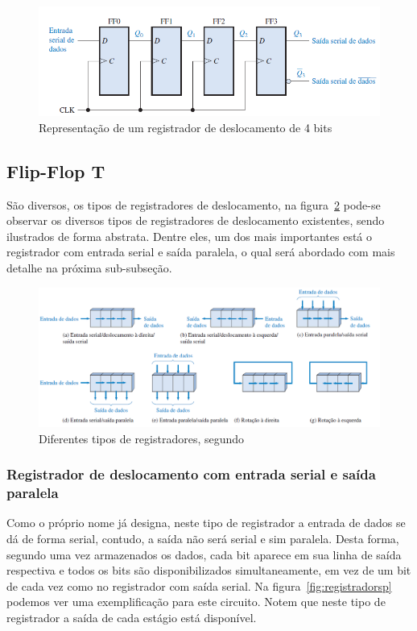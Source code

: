 \documentclass[12pt]{article}
\begin{document}
\begin{figure}[!htbp]
\centering
\includegraphics[width=.7\textwidth]{img/p4/Fig5RegistradorDeslocamento.png}
\caption{Representação de um registrador de deslocamento de 4 bits \cite{floyd2011digital}}
\label{fig:rdeslocamento}
\end{figure}


\subsection{Flip-Flop T}

São diversos, os tipos de registradores de deslocamento, na figura~\ref{fig:registradores} pode-se observar os diversos tipos de registradores de deslocamento existentes, sendo ilustrados de forma abstrata. Dentre eles, um dos mais importantes está o registrador com entrada serial e saída paralela, o qual será abordado com mais detalhe na próxima sub-subseção.

\begin{figure}[!htbp]
\centering
\includegraphics[width=.8\textwidth]{img/p4/Fig6tipodeRegistrador.png}
\caption{Diferentes tipos de registradores, segundo \cite{floyd2011digital}}
\label{fig:registradores}
\end{figure}

\subsubsection{Registrador de deslocamento com entrada serial e saída paralela}

Como o próprio nome já designa, neste tipo de registrador a entrada de dados se dá de forma serial, contudo, a saída não será serial e sim paralela. Desta forma, segundo \cite{floyd2011digital} uma vez armazenados os dados, cada bit aparece em sua linha de saída respectiva e todos os bits são disponibilizados simultaneamente, em vez de um bit de cada vez como no registrador com saída serial. Na figura~\ref{fig:registradorsp} podemos ver uma exemplificação para este circuito. Notem que neste tipo de registrador a saída de cada estágio está disponível.
\end{document}
